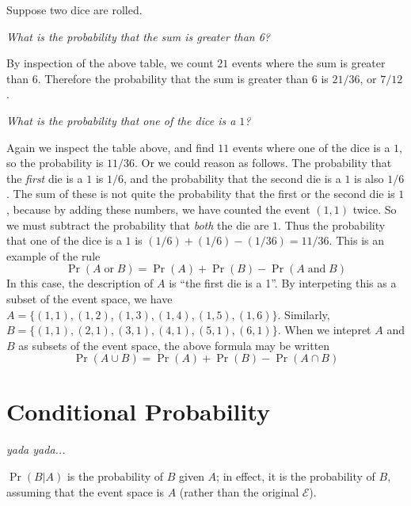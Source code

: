 \begin{xexample}
Suppose two dice are rolled.

\medskip
\emph{What is the probability that
the sum is greater than 6?}

\medskip
By inspection of the above table, we count $21$ events where
the sum is greater than $6$.  Therefore the probability
that the sum is greater than $6$ is $21/36$, or $7/12$.

\medskip
\emph{What is the probability that one of the dice is a $1$?}

\medskip
Again we inspect the table above, and find $11$ events where
one of the dice is a $1$, so the probability is $11/36$.
Or we could reason as follows.  The probability that the
\emph{first} die is a $1$ is $1/6$, and the probability
that the second die is a $1$ is also $1/6$.  The sum
of these is not quite the probability that the first
or the second die is $1$, because by adding these
numbers, we have counted the event $(1,1)$ twice.
So we must subtract the probability that \emph{both}
the die are $1$. Thus the probability that one of the dice
is a $1$ is $(1/6)+(1/6)-(1/36) = 11/36$.  This is an
example of the rule
\[
   \Pr(A \;\textrm{or}\; B) = \Pr(A) + \Pr(B) - \Pr(A \;\textrm{and}\; B)
\]
In this case, the description of $A$ is ``the first die is a 1''.
By interpeting this as a subset of the event space, we have
$A = \{(1,1),(1,2),(1,3),(1,4),(1,5),(1,6)\}$.
Similarly, $B = \{(1,1),(2,1),(3,1),(4,1),(5,1),(6,1)\}$.
When we intepret $A$ and $B$ as subsets of the event space, the
above formula may be written
\[
  \Pr(A \cup B) = \Pr(A) + \Pr(B) - \Pr(A \cap B)
\]
\end{xexample}

\section{Conditional Probability}
%
\emph{yada yada...}

\medskip
\noindent
$\Pr(B|A)$ is the probability of $B$ given
$A$; in effect, it is the probability
of $B$, assuming that the event space
is $A$ (rather than the original $\mathcal{E}$).

